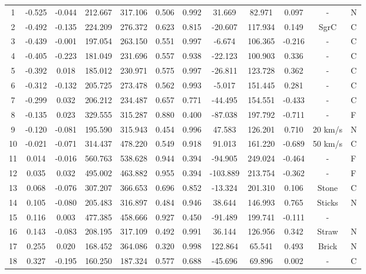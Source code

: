 \begin{table*}
{\begin{tabular}{ccccccccccc}
       1 & -0.525 & -0.044 &  212.667 &  317.106  &  0.506 &  0.992 &   31.669 &   82.971  &  0.097 & - & N \\
       2 & -0.492 & -0.135 &  224.209 &  276.372  &  0.623 &  0.815 &  -20.607 &  117.934  &  0.149 & SgrC & C\\
       3 & -0.439 & -0.001 &  197.054 &  263.150  &  0.551 &  0.997 &   -6.674 &  106.365  & -0.216 & - & C \\
       4 & -0.405 & -0.223 &  181.049 &  231.696  &  0.557 &  0.938 &  -22.123 &  100.903  &  0.336 & - & C \\
       5 & -0.392 &  0.018 &  185.012 &  230.971  &  0.575 &  0.997 &  -26.811 &  123.728  &  0.362 & - & C \\
       6 & -0.312 & -0.132 &  205.725 &  273.478  &  0.562 &  0.993 &   -5.017 &  151.445  &  0.281 & - & C \\
       7 & -0.299 &  0.032 &  206.212 &  234.487  &  0.657 &  0.771 &  -44.495 &  154.551  & -0.433 & - & C \\
       8 & -0.135 &  0.023 &  329.555 &  315.287  &  0.880 &  0.400 &  -87.038 &  197.792  & -0.711 & - & F \\
       9 & -0.120 & -0.081 &  195.590 &  315.943  &  0.454 &  0.996 &   47.583 &  126.201  &  0.710 & 20 km/s & N \\
      10 & -0.021 & -0.071 &  314.437 &  478.220  &  0.549 &  0.918 &   91.013 &  161.220  & -0.689 & 50 km/s & C \\
      11 &  0.014 & -0.016 &  560.763 &  538.628  &  0.944 &  0.394 &  -94.905 &  249.024  & -0.464 & - & F \\
      12 &  0.035 &  0.032 &  495.002 &  463.882  &  0.955 &  0.394 & -103.889 &  213.754  & -0.362 & - & F \\
      13 &  0.068 & -0.076 &  307.207 &  366.653  &  0.696 &  0.852 &  -13.324 &  201.310  &  0.106 & Stone & C \\
      14 &  0.105 & -0.080 &  205.483 &  316.897  &  0.484 &  0.946 &   38.644 &  146.993  &  0.765 & Sticks & N \\
      15 &  0.116 &  0.003 &  477.385 &  458.666  &  0.927 &  0.450 &  -91.489 &  199.741  & -0.111 & - & \\
      16 &  0.143 & -0.083 &  208.195 &  317.109  &  0.492 &  0.991 &   36.144 &  126.956  &  0.342 & Straw & N\\
      17 &  0.255 &  0.020 &  168.452 &  364.086  &  0.320 &  0.998 &  122.864 &   65.541  &  0.493 & Brick & N\\
      18 &  0.327 & -0.195 &  160.250 &  187.324  &  0.577 &  0.688 &  -45.696 &   69.896  &  0.002 & - & C \\

\end{tabular}}
\end{table*}
